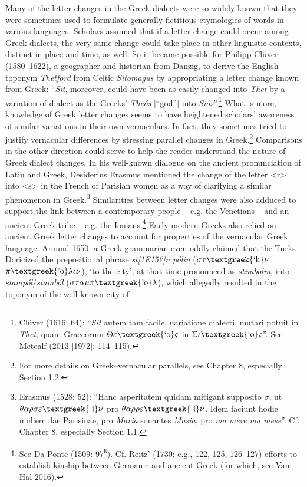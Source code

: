 \begin{styleStandard}
Many of the letter changes in the Greek dialects were so widely known that they were sometimes used to formulate generally fictitious etymologies of words in various languages. Scholars assumed that if a letter change could occur among Greek dialects, the very same change could take place in other linguistic contexts, distinct in place and time, as well. So it became possible for Philipp Clüver (1580–1622), a geographer and historian from Danzig, to derive the English toponym \textit{Thetford} from Celtic \textit{Sitomagus} by appropriating a letter change known from Greek: “\textit{Sit}, moreover, could have been as easily changed into \textit{Thet} by a variation of dialect as the Greeks’ \textit{Theós} [“god”]\textit{ }into \textit{Siós}”.\footnote{\textrm{ Clüver (1616: 64): “}\textrm{\textit{Sit}}\textrm{ autem tam facile, uariatione dialecti, mutari potuit in }\textrm{\textit{Thet}}\textrm{, quam Graecorum $\Theta \varepsilon \text{\textgreek{`o}}\varsigma $ in $\Sigma \iota \text{\textgreek{`o}}\varsigma $”. See Metcalf (2013 [1972]: 114–115).}} What is more, knowledge of Greek letter changes seems to have heightened scholars’ awareness of similar variations in their own vernaculars. In fact, they sometimes tried to justify vernacular differences by stressing parallel changes in Greek.\footnote{\textrm{ For more details on Greek–vernacular parallels, see Chapter 8, especially Section 1.2.}} Comparisons in the other direction could serve to help the reader understand the nature of Greek dialect changes. In his well-known dialogue on the ancient pronunciation of Latin and Greek, Desiderius Erasmus mentioned the change of the letter {\textless}r{\textgreater} into {\textless}s{\textgreater} in the French of Parisian women as a way of clarifying a similar phenomenon in Greek.\footnote{\textrm{ Erasmus (1528: 52): “Hanc asperitatem quidam mitigant supposito $\sigma $, ut $\theta \alpha \rho \sigma \varepsilon \text{\textgreek{~i}}\nu $ pro $\theta \alpha \rho \rho \varepsilon \text{\textgreek{~i}}\nu $. Idem faciunt hodie mulierculae Parisinae, pro }\textrm{\textit{Maria}}\textrm{ sonantes }\textrm{\textit{Masia}}\textrm{, pro }\textrm{\textit{ma mere ma mese}}\textrm{”. Cf. Chapter 8, especially Section 1.1.}} Similarities between letter changes were also adduced to support the link between a contemporary people – e.g. the Venetians – and an ancient Greek tribe – e.g. the Ionians.\footnote{\textrm{ See Da Ponte (1509: 97}\textrm{\textsc{\textsuperscript{r}}}\textrm{). Cf. Reitz’ (1730: e.g., 122, 125, 126–127) efforts to establish kinship between Germanic and ancient Greek (for which, see Van Hal 2016).}} Early modern Greeks also relied on ancient Greek letter changes to account for properties of the vernacular Greek language. Around 1650, a Greek grammarian even oddly claimed that the Turks Doricized the prepositional phrase \textit{st[1E15?]n pólin} ($\sigma \tau \text{\textgreek{`h}}\nu $ $\pi \text{\textgreek{'o}}\lambda \iota \nu $), ‘to the city’, at that time pronounced as \textit{stimbolin}, into \textit{stampól}/\textit{stamból} ($\sigma \tau \alpha \mu \pi \text{\textgreek{'o}}\lambda $), which allegedly resulted in the toponym of the well-known city of 
\end{styleStandard}
